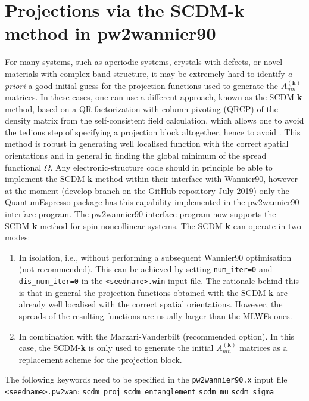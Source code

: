 \section{Projections via the SCDM-\textbf{k} method in pw2wannier90}
For many systems, such as aperiodic systems, crystals with defects, or novel materials with complex band structure,  it may be extremely hard to identify \emph{a-priori} a good initial guess for the projection functions used to generate the $A_{mn}^{(\mathbf{k})}$ matrices. In these cases, one can use a different approach, known as the SCDM-\textbf{k} method\cite{LinLin-ArXiv2017}, based on a QR factorization with column pivoting (QRCP) of the density matrix from the self-consistent field calculation, which allows one to avoid the tedious step of specifying a projection block altogether, hence to avoid . This method is robust in generating well localised function with the correct spatial orientations and in general in finding the global minimum of the spread functional $\Omega$. Any electronic-structure code should in principle be able to implement the SCDM-\textbf{k} method within their interface with Wannier90, however at the moment (develop branch on the GitHub repository July 2019) only the QuantumEspresso package has this capability implemented in the pw2wannier90 interface program.
The pw2wannier90 interface program now supports the SCDM-\textbf{k} method for spin-noncollinear systems.
 The SCDM-\textbf{k} can operate in two modes: 
\begin{enumerate}
\item In isolation, i.e., without performing a subsequent Wannier90 optimisation (not recommended). This can be achieved by setting {\tt num\_iter=0} and {\tt dis\_num\_iter=0} in the \verb#<seedname>.win# input file. The rationale behind this is that in general the projection functions obtained with the SCDM-\textbf{k} are already well localised with the correct spatial orientations. However, the spreads of the resulting functions are usually larger than the MLWFs ones.  
\item In combination with the Marzari-Vanderbilt (recommended option). In this case, the SCDM-\textbf{k} is only used to generate the initial $A_{mn}^{(\mathbf{k})}$ matrices as a replacement scheme for the projection block.
\end{enumerate}

The following keywords need to be specified in the {\tt pw2wannier90.x} input file \verb#<seedname>.pw2wan#:
\noindent
\verb#scdm_proj#
\verb#scdm_entanglement#
\verb#scdm_mu#
\verb#scdm_sigma#
\noindent
